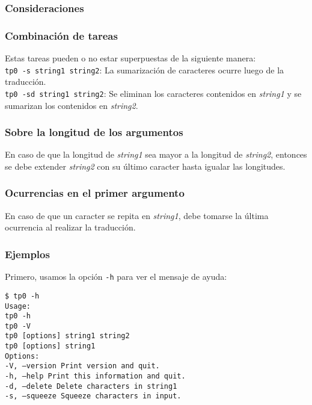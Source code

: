 \documentclass[a4paper,10pt]{article}
\begin{document}
\subsubsection{Consideraciones}

\subsubsection{Combinaci\'{o}n de tareas}
Estas tareas pueden o no estar superpuestas de la siguiente manera:\\
\indent\texttt{tp0 -s string1 string2}: La sumarizaci\'{o}n de caracteres ocurre luego de la traducci\'{o}n.\\
\indent\texttt{tp0 -sd string1 string2}: Se eliminan los caracteres contenidos en \textit{string1} y se sumarizan los contenidos en \textit{string2}.

\subsubsection{Sobre la longitud de los argumentos}
En caso de que la longitud de \textit{string1} sea mayor a la longitud de \textit{string2}, entonces se debe extender \textit{string2} con su \'{u}ltimo caracter hasta igualar las longitudes.

\subsubsection{Ocurrencias en el primer argumento}
En caso de que un caracter se repita en \textit{string1}, debe tomarse la \'{u}ltima ocurrencia al realizar la traducci\'{o}n.

\newpage
\newpage

\subsubsection{Ejemplos}
Primero, usamos la opci\'{o}n \indent\texttt{-h} para ver el mensaje de ayuda:

\indent\texttt{\$ tp0 -h}\\
\indent\texttt{Usage:}\\
\indent\texttt{tp0 -h}\\
\indent\texttt{tp0 -V}\\
\indent\texttt{tp0 [options] string1 string2}\\
\indent\texttt{tp0 [options] string1}\\
\indent\texttt{Options:}\\
\indent\texttt{-V, --version Print version and quit.}\\
\indent\texttt{-h, --help Print this information and quit.}\\
\indent\texttt{-d, --delete Delete characters in string1}\\
\indent\texttt{-s, --squeeze Squeeze characters in input.}\\
\end{document}
